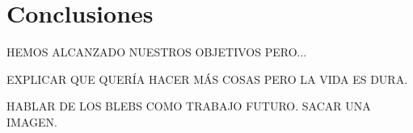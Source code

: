 \chapter{Conclusiones}
\label{cap:conclusions}

HEMOS ALCANZADO NUESTROS OBJETIVOS PERO...

EXPLICAR QUE QUERÍA HACER MÁS COSAS PERO LA VIDA ES DURA.

HABLAR DE LOS BLEBS COMO TRABAJO FUTURO. SACAR UNA IMAGEN.
